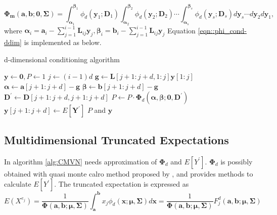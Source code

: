 \begin{equation}\label{eqn::phi_cond-ddim}
	\boldsymbol{\Phi_m}(\mathbf{a},\mathbf{b};\mathbf{0},\boldsymbol{\Sigma})=\int_{\mathbf{\alpha}_1}^{\mathbf{\beta}_1}\phi_d(\mathbf{y}_1;\mathbf{D}_1)\int_{\mathbf{\alpha}_2}^{\mathbf{\beta}_2}\phi_d(\mathbf{y}_2;\mathbf{D}_2)\cdots\int_{\mathbf{\alpha}_s}^{\mathbf{\beta}_s}\phi_d(\mathbf{y}_s;\mathbf{D}_s)d\mathbf{y}_s\cdots d\mathbf{y}_2d\mathbf{y}_1,
\end{equation}
where $\boldsymbol{\alpha}_i=\mathbf{a}_i-\sum_{j=1}^{i-1}\mathbf{L}_{ij}\mathbf{y}_j, \boldsymbol{\beta}_i=\mathbf{b}_i-\sum_{j=1}^{i-1}\mathbf{L}_{ij}\mathbf{y}_j$
Equation \eqref{eqn::phi_cond-ddim} is implemented as below.

\begin{algorithm}[ht]
	\caption{d-dimensional conditioning algorithm}
	\begin{algorithmic}[1]
		\State $\mathbf{y}\leftarrow\mathbf{0},P\leftarrow1$
		\State $j\leftarrow(i-1)d$
		\State $\mathbf{g}\leftarrow\mathbf{L}[j+1:j+d,1:j]\mathbf{y}[1:j]$
		\State $\boldsymbol{\alpha}\leftarrow\mathbf{a}[j+1:j+d]-\mathbf{g}$
		\State $\boldsymbol{\beta}\leftarrow\mathbf{b}[j+1:j+d]-\mathbf{g}$
		\State $\mathbf{D}^\prime\leftarrow\mathbf{D}[j+1:j+d,j+1:j+d]$
		\State $P\leftarrow P\cdot\boldsymbol{\Phi}_d(\boldsymbol{\alpha},\boldsymbol{\beta};\mathbf{0},\mathbf{D}^\prime)$
		\State $\mathbf{y}[j+1:j+d]\leftarrow E[\mathbf{Y}^\prime]$
		\EndFor
		\State\Return $P$ and $\mathbf{y}$
		\EndProcedure
	\end{algorithmic}\label{alg:CMVN}
\end{algorithm}

\subsection{Multidimensional Truncated Expectations}
In algorithm \ref{alg:CMVN} needs approximation of $\boldsymbol{\Phi}_d$ and $E[Y^\prime]$. $\boldsymbol{\Phi}_d$ is possibly obtained with quasi monte calro method proposed by \citet{genz1992numerical}, and \citet{kan2017moments} provides methods to calculate $E[Y^\prime]$. The truncated expectation is expressed as
$$E(X^{e_j})=\frac{1}{\boldsymbol{\Phi}(\mathbf{a},\mathbf{b};\boldsymbol{\mu},\boldsymbol{\Sigma})}\int_\mathbf{a}^\mathbf{b}x_j\phi_d(\mathbf{x};\boldsymbol{\mu},\boldsymbol{\Sigma})d\mathbf{x}=\frac{1}{\boldsymbol{\Phi}(\mathbf{a},\mathbf{b};\boldsymbol{\mu},\boldsymbol{\Sigma})}F_j^d(\mathbf{a},\mathbf{b};\boldsymbol{\mu},\boldsymbol{\Sigma})$$

